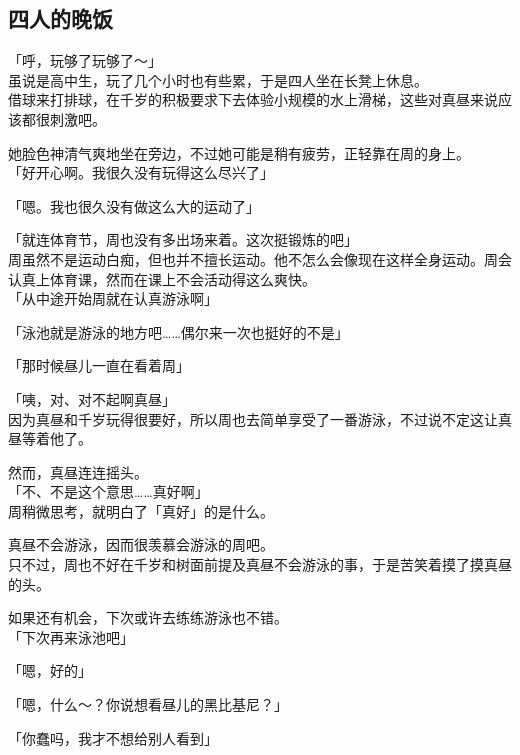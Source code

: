 \subsection{四人的晚饭}

「呼，玩够了玩够了～」\\

虽说是高中生，玩了几个小时也有些累，于是四人坐在长凳上休息。\\

借球来打排球，在千岁的积极要求下去体验小规模的水上滑梯，这些对真昼来说应该都很刺激吧。

她脸色神清气爽地坐在旁边，不过她可能是稍有疲劳，正轻靠在周的身上。\\

「好开心啊。我很久没有玩得这么尽兴了」

「嗯。我也很久没有做这么大的运动了」

「就连体育节，周也没有多出场来着。这次挺锻炼的吧」\\

周虽然不是运动白痴，但也并不擅长运动。他不怎么会像现在这样全身运动。周会认真上体育课，然而在课上不会活动得这么爽快。\\

「从中途开始周就在认真游泳啊」

「泳池就是游泳的地方吧……偶尔来一次也挺好的不是」

「那时候昼儿一直在看着周」

「咦，对、对不起啊真昼」\\

因为真昼和千岁玩得很要好，所以周也去简单享受了一番游泳，不过说不定这让真昼等着他了。

然而，真昼连连摇头。\\

「不、不是这个意思……真好啊」\\

周稍微思考，就明白了「真好」的是什么。

真昼不会游泳，因而很羡慕会游泳的周吧。\\

只不过，周也不好在千岁和树面前提及真昼不会游泳的事，于是苦笑着摸了摸真昼的头。

如果还有机会，下次或许去练练游泳也不错。\\

「下次再来泳池吧」

「嗯，好的」

「嗯，什么～？你说想看昼儿的黑比基尼？」

「你蠢吗，我才不想给别人看到」

